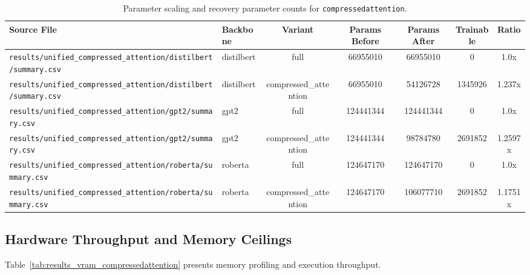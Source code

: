 \begin{table}[t]
\centering
\small
\begin{tabular}{llccccc}
\toprule
\textbf{Source File} & \textbf{Backbone} & \textbf{Variant} & \textbf{Params Before} & \textbf{Params After} & \textbf{Trainable} & \textbf{Ratio} \\
\midrule
\texttt{results/unified\_compressed\_attention/distilbert/summary.csv} & distilbert & full & 66955010 & 66955010 & 0 & 1.0x \\
\texttt{results/unified\_compressed\_attention/distilbert/summary.csv} & distilbert & compressed\_attention & 66955010 & 54126728 & 1345926 & 1.237x \\
\texttt{results/unified\_compressed\_attention/gpt2/summary.csv} & gpt2 & full & 124441344 & 124441344 & 0 & 1.0x \\
\texttt{results/unified\_compressed\_attention/gpt2/summary.csv} & gpt2 & compressed\_attention & 124441344 & 98784780 & 2691852 & 1.2597x \\
\texttt{results/unified\_compressed\_attention/roberta/summary.csv} & roberta & full & 124647170 & 124647170 & 0 & 1.0x \\
\texttt{results/unified\_compressed\_attention/roberta/summary.csv} & roberta & compressed\_attention & 124647170 & 106077710 & 2691852 & 1.1751x \\
\bottomrule
\end{tabular}
\caption{Parameter scaling and recovery parameter counts for \texttt{compressedattention}.}
\label{tab:results_params_compressedattention}
\end{table}

\subsection{Hardware Throughput and Memory Ceilings}
Table~\ref{tab:results_vram_compressedattention} presents memory profiling and execution throughput.

